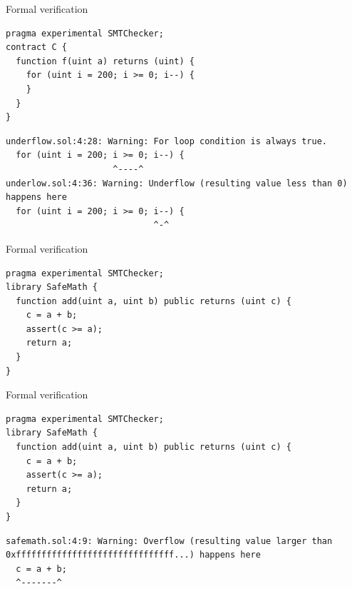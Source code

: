 \documentclass[aspectratio=169,10pt]{beamer}
\begin{document}
\begin{frame}[fragile]{Formal verification}
  \begin{mdframed}
  \begin{lstlisting}[language=Solidity]
pragma experimental SMTChecker;
contract C {
  function f(uint a) returns (uint) {
    for (uint i = 200; i >= 0; i--) {
    }
  }
}
  \end{lstlisting}
  \end{mdframed}
  \begin{mdframed}
    \begin{lstlisting}[language=Console]
underflow.sol:4:28: Warning: For loop condition is always true.
  for (uint i = 200; i >= 0; i--) {
                     ^----^
underlow.sol:4:36: Warning: Underflow (resulting value less than 0) happens here
  for (uint i = 200; i >= 0; i--) {
                             ^-^
    \end{lstlisting}
    \end{mdframed}
\end{frame}

\begin{frame}[fragile]{Formal verification}
  \begin{mdframed}
  \begin{lstlisting}[language=Solidity]
pragma experimental SMTChecker;
library SafeMath {
  function add(uint a, uint b) public returns (uint c) {
    c = a + b;
    assert(c >= a);
    return a;
  }
}
\end{lstlisting}
\end{mdframed}
\end{frame}

\begin{frame}[fragile]{Formal verification}
  \begin{mdframed}
  \begin{lstlisting}[language=Solidity]
pragma experimental SMTChecker;
library SafeMath {
  function add(uint a, uint b) public returns (uint c) {
    c = a + b;
    assert(c >= a);
    return a;
  }
}
\end{lstlisting}
\end{mdframed}
\begin{mdframed}
\begin{lstlisting}[language=Console]
safemath.sol:4:9: Warning: Overflow (resulting value larger than 0xfffffffffffffffffffffffffffffff...) happens here
  c = a + b;
  ^-------^
\end{lstlisting}
\end{mdframed}
\end{frame}
\end{document}
